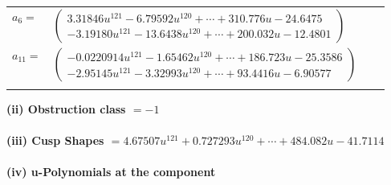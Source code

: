 \documentclass[1p]{elsarticle_modified}
\theoremstyle{definition}
\begin{document}
\begin{tabular}{m{7pt} m{180pt} m{7pt} m{180pt} }
\flushright $a_{6}=$&$\begin{pmatrix}3.31846 u^{121}-6.79592 u^{120}+\cdots+310.776 u-24.6475\\-3.19180 u^{121}-13.6438 u^{120}+\cdots+200.032 u-12.4801\end{pmatrix}$ \\
\flushright $a_{11}=$&$\begin{pmatrix}-0.0220914 u^{121}-1.65462 u^{120}+\cdots+186.723 u-25.3586\\-2.95145 u^{121}-3.32993 u^{120}+\cdots+93.4416 u-6.90577\end{pmatrix}$\\&\end{tabular}
\flushleft \textbf{(ii) Obstruction class $= -1$}\\~\\
\flushleft \textbf{(iii) Cusp Shapes $= 4.67507 u^{121}+0.727293 u^{120}+\cdots+484.082 u-41.7114$}\\~\\
\newpage\renewcommand{\arraystretch}{1}
\flushleft \textbf{(iv) u-Polynomials at the component}\newline \\
\end{document}
